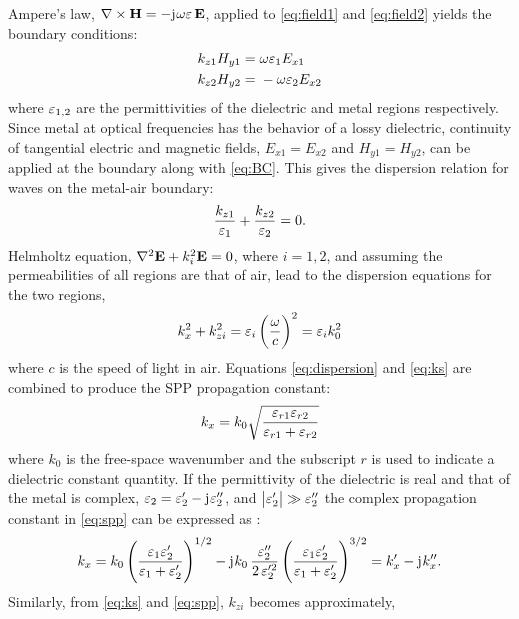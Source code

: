 \documentclass[11pt]{article}
\begin{document}
Ampere's law, $ \nabla\times{\mathbf{H}} = -\mathrm{j}\mkern1mu \omega \varepsilon \,\mathbf{E}$, applied to \eqref{eq:field1} and \eqref{eq:field2} yields the boundary conditions:
%
\begin{subequations}
  \begin{align}
    k_{z1} H_{y1} ={}& \omega \varepsilon_1 E_{x1}
    \label{eq:bc1} \\
    k_{z2} H_{y2} ={}& -\omega \varepsilon_2 E_{x2}
    \label{eq:bc2}
  \end{align}
  \label{eq:BC}%
\end{subequations}
%
where $\varepsilon_{1,2}$ are the permittivities of the dielectric and metal regions respectively. Since metal at optical frequencies has the behavior of a lossy dielectric, continuity of tangential electric and magnetic fields, $E_{x1} = E_{x2}$ and $H_{y1} = H_{y2}$, can be applied at the boundary along with \eqref{eq:BC}. This gives the dispersion relation for waves on the metal-air boundary:
%
\begin{equation}
  \frac{k_{z1}}{\varepsilon_1} + \frac{k_{z2}}{\varepsilon_2} = 0.
  \label{eq:dispersion}
\end{equation}
%
Helmholtz equation, $\nabla^2 \mathbf{E} + k_i^2 \mathbf{E} = 0$, where $i = 1,2$, and assuming the permeabilities of all regions are that of air, lead to the dispersion equations for the two regions,
%
\begin{equation}
  k_x^2 + k_{zi}^2 = \varepsilon_i \left( \frac{\omega}{c} \right)^2 = \varepsilon_i k_0^2
  \label{eq:ks}
\end{equation}
%
where $c$ is the speed of light in air. Equations \eqref{eq:dispersion} and \eqref{eq:ks} are combined to produce the SPP propagation constant:
%
\begin{equation}
  k_x = k_0 \sqrt{\frac{\varepsilon_{r1} \varepsilon_{r2}}{\varepsilon_{r1} + \varepsilon_{r2}}}
  \label{eq:spp}
\end{equation}
%
where $k_0$ is the free-space wavenumber and the subscript $r$ is used to indicate a dielectric constant quantity. If the permittivity of the dielectric is real and that of the metal is complex, $\varepsilon_2 = \varepsilon_2' - \mathrm{j}\mkern1mu \varepsilon_2''$, and $\left|\varepsilon_2' \right| \gg \varepsilon_2''$  the complex propagation constant in \eqref{eq:spp} can be expressed as \cite{Raether1988}:
%
\begin{equation}
  k_x = k_0 \left( \frac{\varepsilon_1 \varepsilon_2'}{\varepsilon_1 + \varepsilon_2'} \right)^{1/2} - \mathrm{j}\mkern1mu k_0 \, \frac{\varepsilon_2''}{2 \,\varepsilon_2'^2} \left( \frac{ \varepsilon_1 \varepsilon_2'}{\varepsilon_1 + \varepsilon_2'} \right)^{3/2} = k_x' - \mathrm{j}\mkern1mu k_x''.
  \label{eq:complec_kx}
\end{equation}
%
Similarly, from \eqref{eq:ks} and \eqref{eq:spp}, $k_{zi}$ becomes approximately,
%
\end{document}
